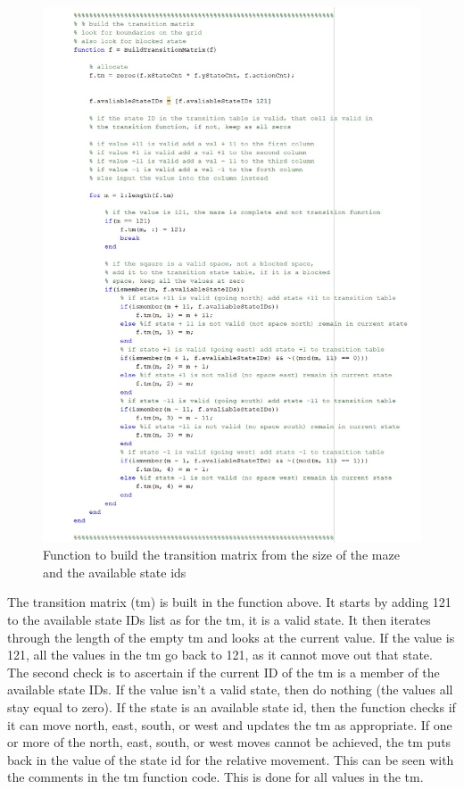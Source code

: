 \documentclass [11pt]{article}
\begin{document}
\begin{figure}[H]
\centerline{\includegraphics[width=12cm]{Transition_table}}
\caption{Function to build the transition matrix from the size of the maze and the available state ids}
\label{fig:tm}
\end{figure}

The transition matrix (tm) is built in the function above. It starts by adding 121 to the available state IDs list as for the tm, it is a valid state. It then iterates through the length of the empty tm and looks at the current value. If the value is 121, all the values in the tm go back to 121, as it cannot move out that state. The second check is to ascertain if the current ID of the tm is a member of the available state IDs. If the value isn’t a valid state, then do nothing (the values all stay equal to zero). If the state is an available state id, then the function checks if it can move north, east, south, or west and updates the tm as appropriate. If one or more of the north, east, south, or west moves cannot be achieved, the tm puts back in the value of the state id for the relative movement. This can be seen with the comments in the tm function code. This is done for all values in the tm.
\end{document}
